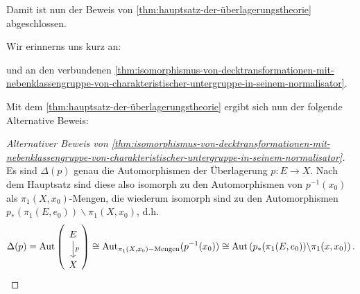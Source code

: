 Damit ist nun der Beweis von \autoref{thm:hauptsatz-der-überlagerungstheorie} abgeschlossen.

Wir erinnerns uns kurz an:



und an den verbundenen \autoref{thm:isomorphismus-von-decktransformationen-mit-nebenklassengruppe-von-charakteristischer-untergruppe-in-seinem-normalisator}.


Mit dem \autoref{thm:hauptsatz-der-überlagerungstheorie} ergibt sich nun der folgende Alternative Beweis:

\begin{proof}[Alternativer Beweis von \autoref{thm:isomorphismus-von-decktransformationen-mit-nebenklassengruppe-von-charakteristischer-untergruppe-in-seinem-normalisator}]
    
Es sind $\Delta(p)$ genau die Automorphismen der Überlagerung  $p\colon  E \to X$. Nach dem Hauptsatz sind diese also isomorph zu den Automorphismen von $p^{-1} (x_0)$ als $\pi_1(X,x_0)$-Mengen, die wiederum isomorph sind zu den Automorphismen $p_*(\pi_1(E,e_0)) \backslash \pi_1(X,x_0)$, d.h.
\[
    \Delta(p) = \Aut \left(
    \begin{tikzcd}
        E \ar{d}{p} \\ X
    \end{tikzcd}\right) 
    \cong \Aut_{\pi_1(X,x_0)-\text{Mengen}} (p^{-1} (x_0)) \cong \Aut \left( p_*(\pi_1(E,e_0)) \backslash \pi_1(x,x_0) \right) 
.\] 
\end{proof}

